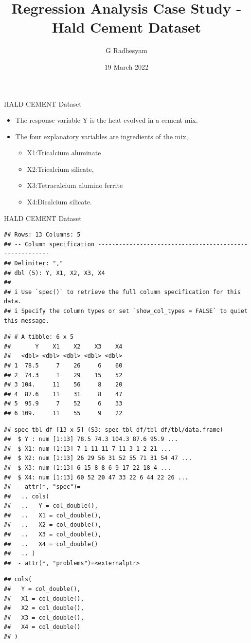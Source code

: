 \documentclass[
  ignorenonframetext,
]{beamer}
\title{Regression Analysis Case Study - Hald Cement Dataset}
\author{G Radhesyam}
\date{19 March 2022}
\providecommand{\tightlist}{%
  \setlength{\itemsep}{0pt}\setlength{\parskip}{0pt}}
\begin{document}
\frame{\titlepage}

\begin{frame}{HALD CEMENT Dataset}
\protect\hypertarget{hald-cement-dataset}{}
\begin{itemize}
\item
  The response variable Y is the heat evolved in a cement mix.
\item
  The four explanatory variables are ingredients of the mix,

  \begin{itemize}
  \tightlist
  \item
    X1:Tricalcium aluminate
  \item
    X2:Tricalcium silicate,
  \item
    X3:Tetracalcium alumino ferrite
  \item
    X4:Dicalcium silicate.
  \end{itemize}
\end{itemize}
\end{frame}

\begin{frame}[fragile]{HALD CEMENT Dataset}
\protect\hypertarget{hald-cement-dataset-1}{}
\begin{verbatim}
## Rows: 13 Columns: 5
## -- Column specification --------------------------------------------------------
## Delimiter: ","
## dbl (5): Y, X1, X2, X3, X4
## 
## i Use `spec()` to retrieve the full column specification for this data.
## i Specify the column types or set `show_col_types = FALSE` to quiet this message.
\end{verbatim}

\begin{verbatim}
## # A tibble: 6 x 5
##       Y    X1    X2    X3    X4
##   <dbl> <dbl> <dbl> <dbl> <dbl>
## 1  78.5     7    26     6    60
## 2  74.3     1    29    15    52
## 3 104.     11    56     8    20
## 4  87.6    11    31     8    47
## 5  95.9     7    52     6    33
## 6 109.     11    55     9    22
\end{verbatim}

\begin{verbatim}
## spec_tbl_df [13 x 5] (S3: spec_tbl_df/tbl_df/tbl/data.frame)
##  $ Y : num [1:13] 78.5 74.3 104.3 87.6 95.9 ...
##  $ X1: num [1:13] 7 1 11 11 7 11 3 1 2 21 ...
##  $ X2: num [1:13] 26 29 56 31 52 55 71 31 54 47 ...
##  $ X3: num [1:13] 6 15 8 8 6 9 17 22 18 4 ...
##  $ X4: num [1:13] 60 52 20 47 33 22 6 44 22 26 ...
##  - attr(*, "spec")=
##   .. cols(
##   ..   Y = col_double(),
##   ..   X1 = col_double(),
##   ..   X2 = col_double(),
##   ..   X3 = col_double(),
##   ..   X4 = col_double()
##   .. )
##  - attr(*, "problems")=<externalptr>
\end{verbatim}

\begin{verbatim}
## cols(
##   Y = col_double(),
##   X1 = col_double(),
##   X2 = col_double(),
##   X3 = col_double(),
##   X4 = col_double()
## )
\end{verbatim}
\end{frame}
\end{document}
